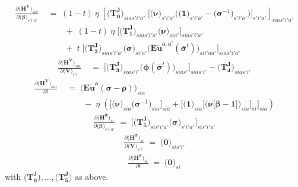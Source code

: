 \documentclass[11pt,fleqn]{article}
\newcommand{\bsigma}{\bm{\sigma}}
\newcommand{\bbeta}{\bm{\beta}}
\newcommand{\brho}{\bm{\rho}}
\newcommand{\bV}{\bm{V}}
\newcommand{\bnu}{\bm{\nu}}
\newcommand{\bzero}{\bm{0}}
\newcommand{\bone}{\bm{1}}
\newcommand{\tu}{\tilde{u}}
\begin{document}
\begin{align*}
	\frac{ \partial \biggl( \bm{H^{V}} \biggr)_{sia} }{ \partial \biggl( \bbeta \biggr)_{s'i'a'} } & \;=\; 
		(1-t) \: \eta \; \left[ \biggl( \bm{T_0^J} \biggr)_{sias'i'a'} \; \Biggl[ \biggl( \bnu \biggr)_{s'i'a'} \Biggl( \biggl( \bone \biggr)_{s'i'a'} - \biggl( \bsigma^{-1} \biggr)_{s'i'a'} \Biggr) \Biggr]_{s'i'a'} \right]_{sias'i'a'} \\
		& \qquad \;+\;  (1-t) \: \eta \; \Biggl[ \biggl( \bm{T_1^J} \biggr)_{sias'i'a'} \biggl( \bnu \biggr)_{sia'} \Biggr]_{sias'i'a'} \\
		& \qquad \;+\; t \; \Biggl[ \biggl( \bm{T_2^J} \biggr)_{sias'i'a'} \biggl( \bsigma \biggr)_{si'a'} \biggl( \bm{{E\tu^{a,a'}}}(\bar{\bsigma}^t) \biggr)_{sii'aa'} \Biggr]_{sias'i'a'}
\end{align*}
\begin{align*}
	\frac{ \partial \biggl( \bm{H^{V}} \biggr)_{sia} }{ \partial \biggl( \bV \biggr)_{s'i'} } & \;=\; 
		\Biggl[ \biggl( \bm{T_3^J} \biggr)_{sias'i'} \biggl( \bm{\phi}(\bar{\bsigma}^t) \biggr)_{sias'} \Biggr]_{sias'i'} - \biggl( \bm{T_4^J} \biggr)_{sias'i'}
\end{align*}
\begin{align*}
	\frac{ \partial \biggl( \bm{H^{V}} \biggr)_{sia} }{ \partial t } & \;=\; 
		\biggl( \bm{{E\tu^{a}}}(\bsigma-\brho) \biggr)_{sia} \\
		& \qquad \;-\; \eta \; \left( \Biggl[ \biggl( \bnu \biggr)_{sia} \biggl( \bsigma^{-1} \biggr)_{sia} \Biggr]_{sia} + \Biggl[ \biggl( \bone \biggr)_{sia} \Biggl[ \biggl( \bnu\bigl[\bbeta-\bone\bigr] \biggr)_{sia} \Biggr]_{si} \Biggr]_{sia} \right)
\end{align*}
\begin{align*}
	\frac{ \partial \biggl( \bm{H^{\sigma}} \biggr)_{si} }{ \partial \biggl( \bbeta \biggr)_{s'i'a'} } \;=\; 
	\Biggl[ \biggl( \bm{T_5^J} \biggr)_{sis'i'a'} \biggl( \bsigma \biggr)_{s'i'a'} \Biggr]_{sis'i'a'}
\end{align*}
\begin{align*}
	\frac{ \partial \biggl( \bm{H^{\sigma}} \biggr)_{si} }{ \partial \biggl( \bV \biggr)_{s'i'} } \;=\; \biggl( \bzero \biggr)_{sis'i'}
\end{align*}
\begin{align*}
	\frac{ \partial \biggl( \bm{H^{\sigma}} \biggr)_{si} }{ \partial t } \;=\; \biggl( \bzero \biggr)_{si}
\end{align*}
with $\biggl(\bm{T_0^J}\biggr), \dots, \biggl(\bm{T_5^J}\biggr)$ as above.
\end{document}
